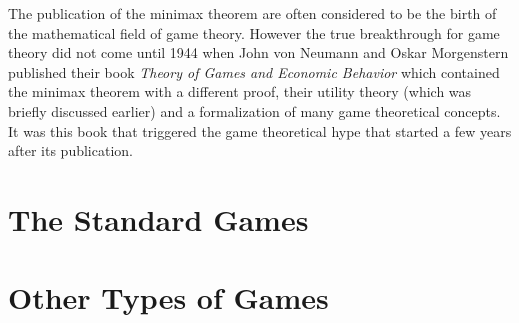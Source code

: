 \documentclass{article}
\theoremstyle{definition}
\theoremstyle{remark}
\begin{document}
The publication of the minimax theorem are often considered to be the
birth of the mathematical field of game theory. However the true
breakthrough for game theory did not come until 1944 when John von
Neumann and Oskar Morgenstern published their book \emph{Theory of
  Games and Economic Behavior} which contained the minimax theorem
with a different proof, their utility theory
(which was briefly discussed earlier) and a formalization
of many game theoretical concepts. It was this book that triggered the
game theoretical hype that started a few years after its
publication.
\section{The Standard Games}

\section{Other Types of Games}

\newpage

\printbibliography
\end{document}
